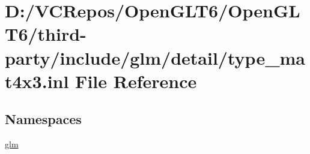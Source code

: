 \hypertarget{type__mat4x3_8inl}{}\section{D\+:/\+V\+C\+Repos/\+Open\+G\+L\+T6/\+Open\+G\+L\+T6/third-\/party/include/glm/detail/type\+\_\+mat4x3.inl File Reference}
\label{type__mat4x3_8inl}
\subsection*{Namespaces}
\begin{DoxyCompactItemize}
\item 
 \mbox{\hyperlink{namespaceglm}{glm}}
\end{DoxyCompactItemize}
